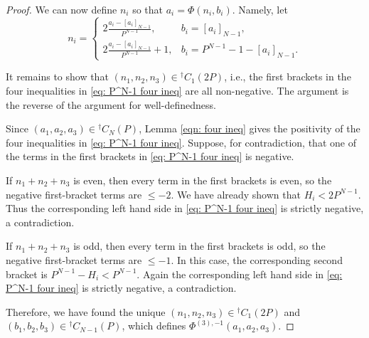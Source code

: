 \documentclass[10pt,a4paper]{amsart}
\begin{document}
\begin{proof}
We can now define $n_i$ so that $a_i=\Phi(n_i,b_i)$.
Namely, let
\[
        n_i=
        \begin{cases}
        2\frac{a_i-[a_i]_{N-1}}{P^{N-1}},
        & b_i=[a_i]_{N-1},\\[6pt]
        2\frac{a_i-[a_i]_{N-1}}{P^{N-1}}+1,
        & b_i=P^{N-1}-1-[a_i]_{N-1}.
        \end{cases}
\]

It remains to show that $(n_1,n_2,n_3)\in{}^\dagger C_1(2P)$, i.e., the first brackets in the four inequalities in \eqref{eq: P^N-1 four ineq} are all non-negative.  
The argument is the reverse of the argument for well-definedness.

Since
$(a_1,a_2,a_3)\in{}^\dagger C_N(P)$, Lemma \ref{eqn: four ineq} gives the positivity of the four inequalities in \eqref{eq: P^N-1 four ineq}.  Suppose,
for contradiction, that one of the terms in the first brackets in
\eqref{eq: P^N-1 four ineq} is negative.

If $n_1+n_2+n_3$ is even, then every term in the first brackets is even, so
the negative first-bracket terms are $\leq -2$.  We have already shown that $H_i<2P^{N-1}$.
Thus the corresponding left hand side in \eqref{eq: P^N-1 four ineq} is
strictly negative, a contradiction.

If $n_1+n_2+n_3$ is odd, then every term in the first brackets is odd, so the
negative first-bracket terms are $\leq -1$.  In this case, the corresponding second bracket
is  $P^{N-1}-H_i<P^{N-1}$. Again the corresponding left hand side in
\eqref{eq: P^N-1 four ineq} is strictly negative, a contradiction.

Therefore, we have found the unique $(n_1,n_2,n_3)\in {}^\dagger C_1(2P)$ and $(b_1,b_2,b_3)\in {}^\dagger C_{N-1}(P)$, which defines $\Phi^{(3),-1}(a_1,a_2,a_3)$.
\end{proof}
\end{document}
